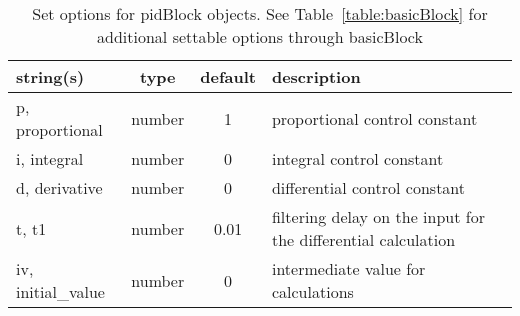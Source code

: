 \begin{table}[ht]
\centering
\begin{tabular}{p{5cm} c c p{7cm}}
\hline
string(s) & type & default & description \\
\hline
p, proportional & number & 1 & proportional control constant\\
i, integral & number & 0 & integral control constant\\
d, derivative & number & 0 & differential control constant\\
t, t1 & number & 0.01 & filtering delay on the input for the differential calculation\\
iv, initial\_value & number & 0 & intermediate value for calculations\\
\hline
\end{tabular}
\caption{Set options for pidBlock objects. See Table~\ref{table:basicBlock} for additional settable options through basicBlock}
\label{table:pidBlock}
\end{table}
